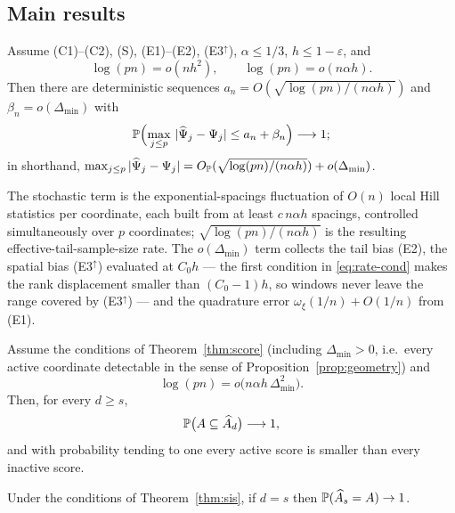 \subsection{Main results}

\begin{theorem}\label{thm:score}
Assume (C1)--(C2), (S), (E1)--(E2), (E3$^{\uparrow}$), $\alpha\le1/3$,
$h\le1-\varepsilon$, and
\begin{equation}\label{eq:rate-cond}
 \log(pn)=o(nh^2),
 \qquad
 \log(pn)=o(n\alpha h).
\end{equation}
Then there are deterministic sequences
$a_n=O(\sqrt{\log(pn)/(n\alpha h)})$ and $\beta_n=o(\Delta_{\min})$ with
\[
 \mathbb P\Bigl(\max_{j\le p}\,|\widehat\Psi_j-\Psi_j|\le a_n+\beta_n\Bigr)
 \longrightarrow1;
\]
in shorthand,
$\max_{j\le p}|\widehat\Psi_j-\Psi_j|
=O_{\mathbb P}(\sqrt{\log(pn)/(n\alpha h)})+o(\Delta_{\min})$.
\end{theorem}

The stochastic term is the exponential-spacings fluctuation of
$O(n)$ local Hill statistics per coordinate, each built from at least
$c\,n\alpha h$ spacings, controlled simultaneously over $p$ coordinates;
$\sqrt{\log(pn)/(n\alpha h)}$ is the resulting effective-tail-sample-size
rate. The $o(\Delta_{\min})$ term collects the tail bias (E2), the spatial
bias (E3$^{\uparrow}$) evaluated at $C_0h$ --- the first condition in
\eqref{eq:rate-cond} makes the rank displacement smaller than $(C_0-1)h$,
so windows never leave the range covered by (E3$^{\uparrow}$) --- and the
quadrature
error $\omega_\xi(1/n)+O(1/n)$ from (E1).

\begin{theorem}\label{thm:sis}
Assume the conditions of Theorem~\ref{thm:score} (including
$\Delta_{\min}>0$, i.e.\ every active coordinate detectable in the
sense of Proposition~\ref{prop:geometry}) and
\begin{equation}\label{eq:sis-cond}
 \log(pn)=o\bigl(n\alpha h\,\Delta_{\min}^2\bigr).
\end{equation}
Then, for every $d\ge s$,
\[
 \mathbb P\bigl(A\subseteq\widehat{A}_d\bigr)\longrightarrow1,
\]
and with probability tending to one every active score is smaller than
every inactive score.
\end{theorem}

\begin{corollary}\label{cor:exact}
Under the conditions of Theorem~\ref{thm:sis}, if $d=s$ then
$\mathbb P(\widehat{A}_s=A)\to1$.
\end{corollary}

